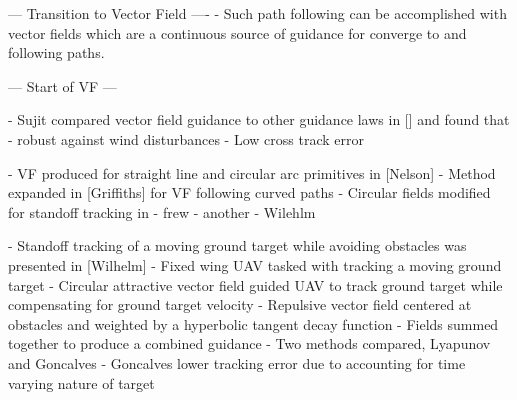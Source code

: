 \documentclass[conf]{new-aiaa}
\begin{document}
%
%
%
% 





%
%
%
%
%



--- Transition to Vector Field ----
- Such path following can be accomplished with vector fields which are a continuous source of guidance for converge to and following paths.

--- Start of VF ---

- Sujit compared vector field guidance to other guidance laws in [] and found that
	- robust against wind disturbances
	- Low cross track error
	
- VF produced for straight line and circular arc primitives in [Nelson]
- Method expanded in [Griffiths] for VF following curved paths
- Circular fields modified for standoff tracking in 
	- frew
	- another
	- Wilehlm


- Standoff tracking of a moving ground target while avoiding obstacles was presented in [Wilhelm]
	- Fixed wing UAV tasked with tracking a moving ground target
    - Circular attractive vector field guided UAV to track ground target while compensating for ground target velocity
    - Repulsive vector field centered at obstacles and weighted by a hyperbolic tangent decay function
    - Fields summed together to produce a combined guidance
    - Two methods compared, Lyapunov and Goncalves
    - Goncalves lower tracking error due to accounting for time varying nature of target
    
\end{document}
